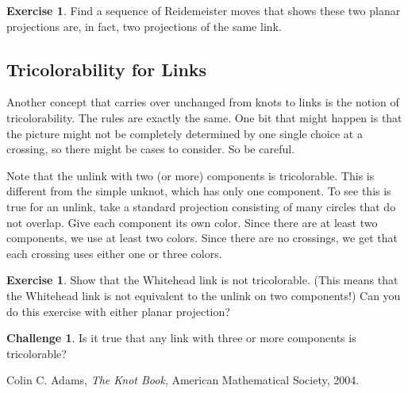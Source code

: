 \documentclass[12pt,letterpaper]{article}
\theoremstyle{definition}
\newtheorem{exercise}[question]{Exercise}
\newtheorem*{challenge}{Challenge}
\begin{document}
\begin{exercise}
Find a sequence of Reidemeister moves that shows these two planar projections are, in fact, two projections of the same link.
\end{exercise}

\subsection*{Tricolorability for Links}

Another concept that carries over unchanged from knots to links is the notion of tricolorability. 
The rules are exactly the same.
One bit that might happen is that the picture might not be completely determined by one single choice at a crossing, so there might be cases to consider.
So be careful.

Note that the unlink with two (or more) components is tricolorable.
This is different from the simple unknot, which has only one component.
To see this is true for an unlink, take a standard projection consisting of many circles that do not overlap. 
Give each component its own color.
Since there are at least two components, we use at least two colors.
Since there are no crossings, we get that each crossing uses either one or three colors.

\begin{exercise}
Show that the Whitehead link is not tricolorable.
(This means that the Whitehead link is not equivalent to the unlink on two components!)
Can you do this exercise with either planar projection?
\end{exercise}

\begin{challenge}
Is it true that any link with three or more components is tricolorable?
\end{challenge}


\begin{thebibliography}{9}

	Colin C. Adams,
	\emph{The Knot Book},
	American Mathematical Society, 
	2004.	


\end{thebibliography}
\end{document}
